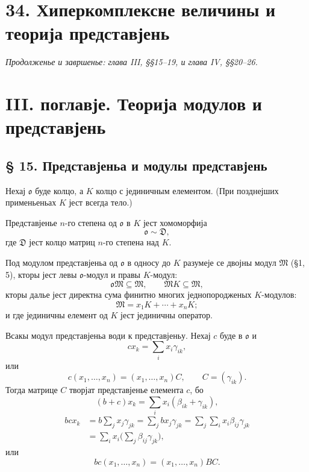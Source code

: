 ﻿\documentclass[11pt]{article}
\providecommand{\mo}{\mathfrak{o}}
\providecommand{\mM}{\mathfrak{M}}
\begin{document}
\section*{34. Хиперкомплексне величины и теорија представјень}
\emph{Продолженье и завршенье: глава III, §§15--19, и глава IV, §§20--26.}

\section*{III. поглавје. Теорија модулов и представјень}

\subsection*{§ 15. Представјеньа и модулы представјень}

Нехај $\mo$ буде колцо, а $K$ колцо с јединичным елементом. (При позднејших применьеньах $K$ јест всегда тело.)

Представјенье $n$-го степена од $\mo$ в $K$ јест хомоморфија
\[
        \mo\sim\mathfrak D,
\]
где $\mathfrak D$ јест колцо матриц $n$-го степена над $K$.

Под модулом представјеньа од $\mo$ в односу до $K$ разумеје се двојны модул $\mM$ (§1, 5), кторы јест левы $\mo$-модул и правы $K$-модул:
\[
        \mo\mM\subseteq\mM,
        \qquad
        \mM K\subseteq\mM,
\]
кторы далье јест директна сума финитно многих једнопородженых $K$-модулов:
\[
        \mM=x_1K+\cdots+x_nK;
\]
и где јединичны елемент од $K$ јест јединичны оператор.

Всакы модул представјеньа води к представјеньу. Нехај $c$ буде в $\mo$ и
\[
        cx_k=\sum_i x_i\gamma_{ik},
\]
или
\[
        c(x_1,\ldots,x_n)=(x_1,\ldots,x_n)C,
        \qquad C=(\gamma_{ik}).
\]
Тогда матрице $C$ творјат представјенье елемента $c$, бо
\[
        (b+c)x_k=\sum_i x_i(\beta_{ik}+\gamma_{ik}),
\]
\[
\begin{aligned}
        bcx_k
        &=b\sum_jx_j\gamma_{jk}
          =\sum_j b x_j\gamma_{jk}
          =\sum_j\sum_i x_i\beta_{ij}\gamma_{jk}  \\
        &=\sum_i x_i\biggl(\sum_j\beta_{ij}\gamma_{jk}\biggr),
\end{aligned}
\]
или
\[
        bc(x_1,\ldots,x_n)=(x_1,\ldots,x_n)BC.
\]
\end{document}
